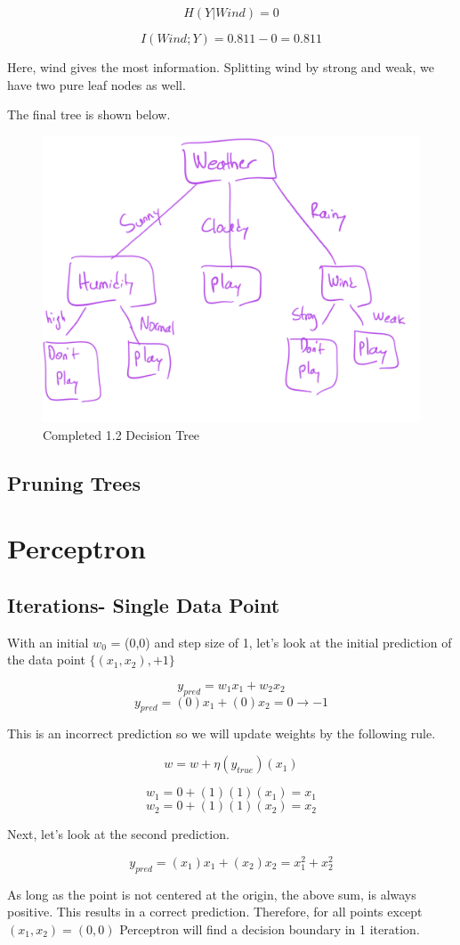 \documentclass{article}
\begin{document}
\[H(Y|Wind) = 0\]

\[I(Wind;Y) = 0.811 - 0 = 0.811\]

Here, wind gives the most information. Splitting wind by strong and weak, we have two pure leaf nodes as well.

The final tree is shown below.

\begin{figure}[H]
    \centering
    \includegraphics[width=0.5\linewidth]{1.2 Tree.png}
    \caption{Completed 1.2 Decision Tree}
\end{figure}


\subsection{Pruning Trees}

\section{Perceptron}
\subsection{Iterations- Single Data Point}
With an initial $w_0$ = (0,0) and step size of 1, let's look at the initial prediction of the data point $\{(x_1, x_2), +1\}$

\[y_{pred} = w_1x_1 + w_2x_2\]
\[y_{pred} = (0)x_1 + (0)x_2 = 0 \rightarrow -1\] 

This is an incorrect prediction so we will update weights by the following rule.

\[w = w + \eta(y_{true})(x_1)\]

\[w_1 = 0 + (1)(1)(x_1) = x_1\]
\[w_2 = 0 + (1)(1)(x_2) = x_2\]

Next, let's look at the second prediction.

\[y_{pred} = (x_1)x_1 + (x_2)x_2 = x_1^2 + x_2^2\]

As long as the point is not centered at the origin, the above sum, is always positive. This results in a correct prediction. Therefore, for all points except $(x_1, x_2) = (0,0)$ Perceptron will find a decision boundary in 1 iteration.
\end{document}
